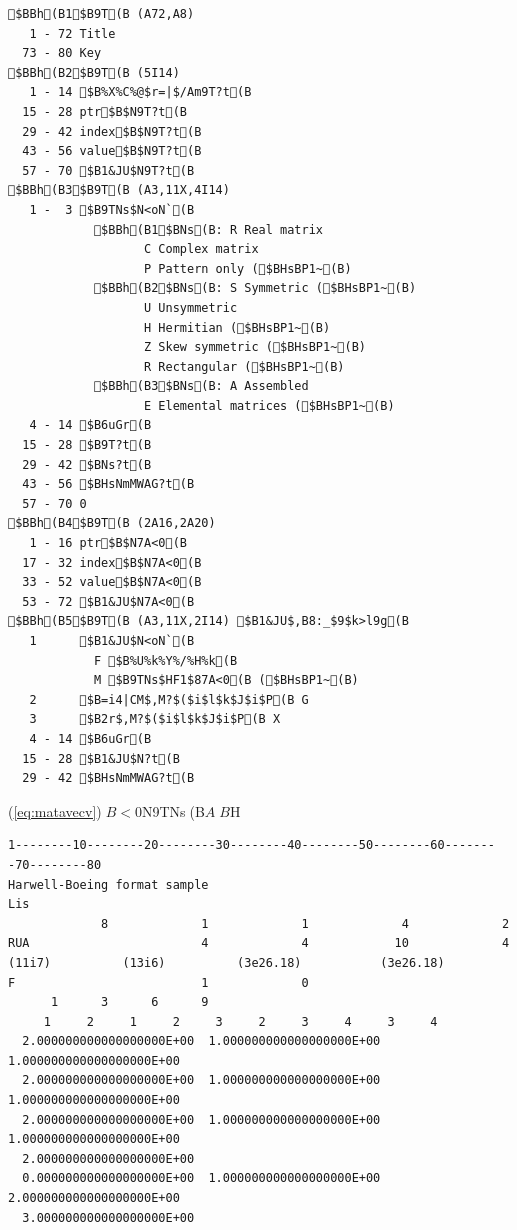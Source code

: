\documentclass[a4paper]{jarticle}
\begin{document}
{{{\small
\begin{verbatim}
$BBh(B1$B9T(B (A72,A8)
   1 - 72 Title
  73 - 80 Key
$BBh(B2$B9T(B (5I14)
   1 - 14 $B%X%C%@$r=|$/Am9T?t(B
  15 - 28 ptr$B$N9T?t(B
  29 - 42 index$B$N9T?t(B
  43 - 56 value$B$N9T?t(B
  57 - 70 $B1&JU$N9T?t(B
$BBh(B3$B9T(B (A3,11X,4I14)
   1 -  3 $B9TNs$N<oN`(B
            $BBh(B1$BNs(B: R Real matrix
                   C Complex matrix
                   P Pattern only ($BHsBP1~(B)
            $BBh(B2$BNs(B: S Symmetric ($BHsBP1~(B)
                   U Unsymmetric
                   H Hermitian ($BHsBP1~(B)
                   Z Skew symmetric ($BHsBP1~(B)
                   R Rectangular ($BHsBP1~(B)
            $BBh(B3$BNs(B: A Assembled
                   E Elemental matrices ($BHsBP1~(B)
   4 - 14 $B6uGr(B
  15 - 28 $B9T?t(B
  29 - 42 $BNs?t(B
  43 - 56 $BHsNmMWAG?t(B
  57 - 70 0
$BBh(B4$B9T(B (2A16,2A20)
   1 - 16 ptr$B$N7A<0(B
  17 - 32 index$B$N7A<0(B
  33 - 52 value$B$N7A<0(B
  53 - 72 $B1&JU$N7A<0(B
$BBh(B5$B9T(B (A3,11X,2I14) $B1&JU$,B8:_$9$k>l9g(B
   1      $B1&JU$N<oN`(B
            F $B%U%k%Y%/%H%k(B
            M $B9TNs$HF1$87A<0(B ($BHsBP1~(B)
   2      $B=i4|CM$,M?$($i$l$k$J$i$P(B G
   3      $B2r$,M?$($i$l$k$J$i$P(B X
   4 - 14 $B6uGr(B
  15 - 28 $B1&JU$N?t(B
  29 - 42 $BHsNmMWAG?t(B
\end{verbatim}
}

(\ref{eq:matavecv})$B<0$N9TNs(B$A$$B$H%

{\small
\begin{verbatim}
1--------10--------20--------30--------40--------50--------60--------70--------80
Harwell-Boeing format sample                                            Lis
             8             1             1             4             2
RUA                        4             4            10             4
(11i7)          (13i6)          (3e26.18)           (3e26.18)
F                          1             0
      1      3      6      9
     1     2     1     2     3     2     3     4     3     4
  2.000000000000000000E+00  1.000000000000000000E+00  1.000000000000000000E+00
  2.000000000000000000E+00  1.000000000000000000E+00  1.000000000000000000E+00
  2.000000000000000000E+00  1.000000000000000000E+00  1.000000000000000000E+00
  2.000000000000000000E+00
  0.000000000000000000E+00  1.000000000000000000E+00  2.000000000000000000E+00
  3.000000000000000000E+00
\end{verbatim}
}

}}
\end{document}
